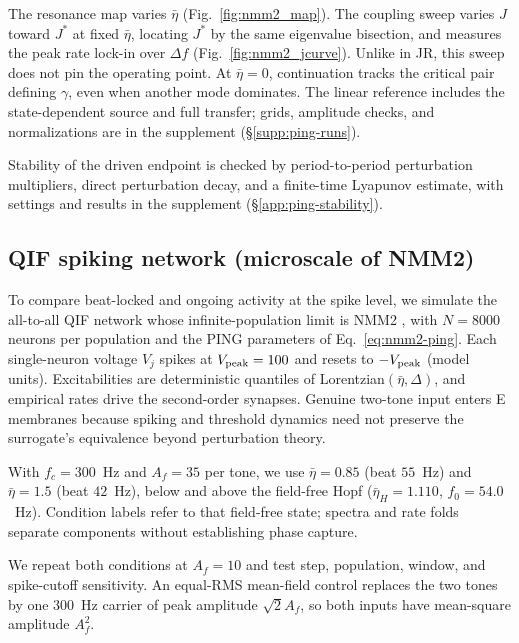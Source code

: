 The resonance map varies $\bar\eta$ (Fig.~\ref{fig:nmm2_map}). The coupling sweep varies
$J$ toward $J^*$ at fixed $\bar\eta$, locating $J^*$ by the same eigenvalue bisection,
and measures the peak rate lock-in over $\Delta f$ (Fig.~\ref{fig:nmm2_jcurve}). Unlike
in JR, this sweep does not pin the operating point. At $\bar\eta=0$, continuation tracks
the critical pair defining $\gamma$, even when another mode dominates. The linear
reference includes the state-dependent source and full transfer; grids, amplitude
checks, and normalizations are in the supplement (\S\ref{supp:ping-runs}).

\ifjne\else

\fi

Stability of the driven endpoint is checked by period-to-period perturbation
multipliers, direct perturbation decay, and a finite-time Lyapunov estimate, with
settings and results in the supplement (\S\ref{app:ping-stability}).

\subsection{QIF spiking network (microscale of NMM2)}\label{sec:qif-methods}
To compare beat-locked and ongoing activity at the spike level, we simulate
the all-to-all QIF network whose infinite-population limit is
NMM2 \cite{montbrio2015,ruffini2025rosetta,clusella2023}, with $N=8000$
neurons per population and the PING parameters of Eq.~\eqref{eq:nmm2-ping}.
Each single-neuron voltage $V_j$ spikes at $V_{\rm peak}=100$ and resets to $-V_{\rm peak}$ (model
units). Excitabilities are deterministic quantiles of Lorentzian$(\bar\eta,\Delta)$,
and empirical rates drive the second-order synapses. Genuine two-tone input enters E
membranes because spiking and threshold dynamics need not preserve the surrogate's
equivalence beyond perturbation theory.

With $f_c=300$~Hz and $A_f=35$ per tone, we use $\bar\eta=0.85$ (beat $55$~Hz) and
$\bar\eta=1.5$ (beat $42$~Hz), below and above the field-free Hopf
($\bar\eta_H=1.110$, $f_0=54.0$~Hz). Condition labels refer to that field-free state;
spectra and rate folds separate components without establishing phase capture.

We repeat both conditions at $A_f=10$ and test step, population, window, and
spike-cutoff sensitivity. An equal-RMS mean-field control replaces the two tones by one
$300$~Hz carrier of peak amplitude $\sqrt2 A_f$, so both inputs have mean-square
amplitude $A_f^2$.

